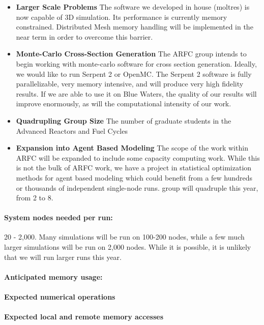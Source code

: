 \documentclass[letterpaper]{article}
\begin{document}
\begin{itemize}
        \item \textbf{Larger Scale Problems} The software we developed in house (moltres) is now capable of 3D 
        simulation. Its performance is currently memory constrained. 
               Distributed Mesh memory handling will be implemented in the near 
                term in order to overcome this barrier. 
        \item \textbf{Monte-Carlo Cross-Section Generation} The ARFC group intends to begin working with monte-carlo software for 
        cross section generation. Ideally, we would like to run Serpent 2 or 
                OpenMC. The Serpent 2 software is fully parallelizable, very 
                memory intensive, and will produce very high fidelity results. 
                If we are able to use it on Blue Waters, the quality of our 
                results will improve enormously, as will the computational 
                intensity of our work.
\item \textbf{Quadrupling Group Size} The number of graduate students in the Advanced Reactors and Fuel Cycles
        \item \textbf{Expansion into Agent Based Modeling} The scope of the work within ARFC will be expanded to include some capacity
computing work. While this is not the bulk of ARFC work, we have a project in
statistical optimization methods for agent based modeling which could benefit
from a few hundreds or thousands of independent single-node runs. 
group will quadruple this year, from 2 to 8. 
\end{itemize}

\paragraph{System nodes needed per run:} 20 - 2,000. Many simulations will be 
run on 100-200 nodes, while a few much larger simulations will be run on 2,000 
nodes. While it is possible, it is unlikely that we will run larger runs 
this year.
\paragraph{Anticipated memory usage:}
\paragraph{Expected numerical operations}
\paragraph{Expected local and remote memory accesses}
\end{document}
